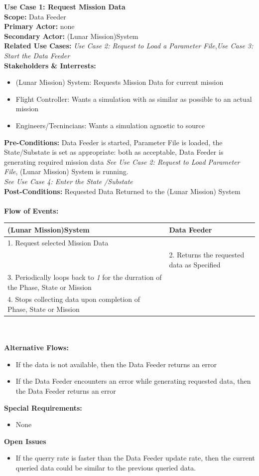 \documentclass[letterpaper]{article}
\begin{document}
\noindent
\textbf{Use Case 1:  Request Mission Data}\\
\textbf{Scope:  }Data Feeder\\
\textbf{Primary Actor:  }none\\
\textbf{Secondary Actor:  }(Lunar Mission)System\\
\textbf{Related Use Cases:  }\textit{Use Case 2:  Request to Load a
Parameter File},\textit{Use Case 3:  Start the Data Feeder}\\
\textbf{Stakeholders \& Interrests:  }
\begin{itemize}
   \item (Lunar Mission) System:  Requests Mission Data for current
      mission
   \item Flight Controller:  Wants a simulation with as similar as
      possible to an actual mission
   \item Engineers/Tecnincians:  Wants a simulation agnostic to source
\end{itemize}
\textbf{Pre-Conditions:  }Data Feeder is started, Parameter File is
loaded, the State/Substate is set as appropriate: both as acceptable,
Data Feeder is generating required mission data
\textit{See Use Case 2:  Request to Load Parameter File}, (Lunar
Mission) System is running.\\\textit{See Use Case 4: Enter the State
/Substate}\\
\textbf{Post-Conditions:  }Requested Data Returned to the (Lunar
Mission) System\\\\
\textbf{Flow of Events:}\\
\begin{tabular}{|p{5.75cm}|p{5.75cm}|}\hline
\textbf{(Lunar Mission)System}&\textbf{Data Feeder}\\\hline
   1.  Request selected Mission Data &\\\hline
   & 2. Returns the requested data as Specified\\\hline
   3. Periodically loops back to \textit{1} for the durration of
   the Phase, State or Mission & \\\hline
   4. Stops collecting data upon completion of Phase, State or
   Mission & \\\hline
\end{tabular}\\\\
\textbf{Alternative Flows: }
\begin{itemize}
   \item[2a]If the data is not available, then the Data Feeder returns
      an error
   \item[2b]If the Data Feeder encounters an error while generating
      requested data, then the Data Feeder returns an error
\end{itemize}
\textbf{Special Requirements: }
\begin{itemize}
   \item None
\end{itemize}
\textbf{Open Issues}
\begin{itemize}
   \item[2a] If the querry rate is faster than the Data Feeder update
      rate, then the current queried data could be similar to the
      previous queried data.
\end{itemize}
\end{document}
